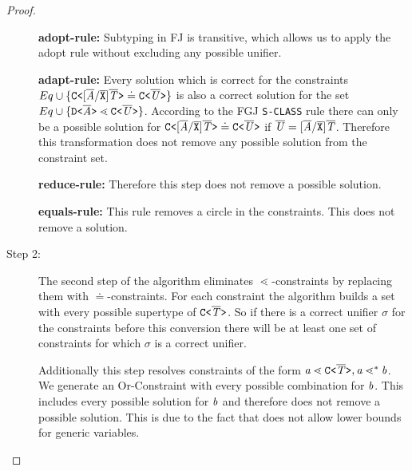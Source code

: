 \begin{proof}
\begin{description}
\textbf{adopt-rule:} Subtyping in FJ is transitive,
which allows us to apply the adopt rule without excluding any possible unifier.

\textbf{adapt-rule:} Every solution which is correct for the constraints
$Eq \cup \{  \mathtt{C \texttt{<} [\overline{\tt \mathit{A}}/\overline{\tt X}]\overline{\tt \mathit{T}} \texttt{>} } \doteq \mathtt{C \texttt{<} \overline{\tt \mathit{U}} \texttt{>} } \}$ is also
a correct solution for the set $Eq \cup \{  \mathtt{D \texttt{<} \overline{\tt \mathit{A}} \texttt{>} } \lessdot \mathtt{C \texttt{<} \overline{\tt \mathit{U}} \texttt{>} } \}$.
According to the FGJ \texttt{S-CLASS} rule there can only be a possible solution for 
$\mathtt{C \texttt{<} [\overline{\tt \mathit{A}}/\overline{\tt X}]\overline{\tt \mathit{T}} \texttt{>} } \doteq \mathtt{C \texttt{<} \overline{\tt \mathit{U}} \texttt{>} }$
if $\overline{\tt \mathit{U}} = [\overline{\tt \mathit{A}}/\overline{\tt X}]\overline{\tt \mathit{T}}$.
Therefore this transformation does not remove any possible solution from the constraint set.

\textbf{reduce-rule:}
Therefore this step does not remove a possible solution.

\textbf{equals-rule:}
This rule removes a circle in the constraints.
This does not remove a solution.

\item[Step 2:]
The second step of the algorithm eliminates $\lessdot$-constraints
by replacing them with $\doteq$-constraints.
For each  constraint the algorithm builds a set with every
possible supertype of $\mathtt{C \texttt{<} \overline{\tt \mathit{T}} \texttt{>} }$.
So if there is a correct unifier $\sigma$ for the constraints before this conversion there will be at least one set of
constraints for which $\sigma$ is a correct unifier.

Additionally this step resolves constraints of the form $\mathit{ a } \lessdot \mathtt{C \texttt{<} \overline{\tt \mathit{T}} \texttt{>} }, \mathit{ a } \lessdot^* \mathit{ b }$.
We generate an Or-Constraint with every possible combination for $\mathit{ b }$.
This includes every possible solution for $\mathit{ b }$ and therefore does not remove a possible solution.
This is due to the fact that \TFGJ does not allow lower bounds for generic variables.


\end{description}
\end{proof}
